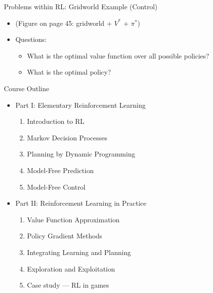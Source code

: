 \documentclass[presentation]{beamer}
\begin{document}
\begin{frame}[label={sec:org41a1453}]{Problems within RL: Gridworld Example (Control)}
\begin{itemize}
\item (Figure on page 45: gridworld + \(V^*\) + \(\pi^*\))
\item Questions:
\begin{itemize}
\item What is the optimal value function over all possible policies?
\item What is the optimal policy?
\end{itemize}
\end{itemize}
\end{frame}
\begin{frame}[label={sec:org2056056}]{Course Outline}
\begin{itemize}
\item Part I: Elementary Reinforcement Learning
\begin{enumerate}
\item Introduction to RL
\item Markov Decision Processes
\item Planning by Dynamic Programming
\item Model-Free Prediction
\item Model-Free Control
\end{enumerate}
\item Part II: Reinforcement Learning in Practice
\begin{enumerate}
\item Value Function Approximation
\item Policy Gradient Methods
\item Integrating Learning and Planning
\item Exploration and Exploitation
\item Case study — RL in games
\end{enumerate}
\end{itemize}
\end{frame}
\end{document}
